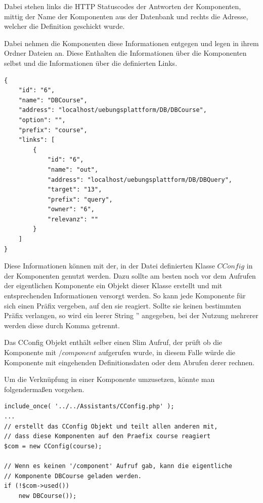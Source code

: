 Dabei stehen links die HTTP Statuscodes der Antworten der Komponenten, mittig der Name der Komponenten aus der Datenbank und rechts die Adresse, welcher die Definition geschickt wurde.

Dabei nehmen die Komponenten diese Informationen entgegen und legen in ihrem Ordner  Dateien an.
Diese Enthalten die Informationen über die Komponenten selbst und die Informationen über die definierten Links.

\begin{minipage}{\textwidth}
\begin{lstlisting}
{
    "id": "6",
    "name": "DBCourse",
    "address": "localhost/uebungsplattform/DB/DBCourse",
    "option": "",
    "prefix": "course",
    "links": [
        {
            "id": "6",
            "name": "out",
            "address": "localhost/uebungsplattform/DB/DBQuery",
            "target": "13",
            "prefix": "query",
            "owner": "6",
            "relevanz": ""
        }
    ]
}
\end{lstlisting}
\end{minipage}

Diese Informationen können mit der, in der Datei  definierten Klasse $CConfig$ in der Komponenten genutzt werden.
Dazu sollte am besten noch vor dem Aufrufen der eigentlichen Komponente ein Objekt dieser Klasse erstellt und mit entsprechenden Informationen versorgt werden. So kann jede Komponente für sich einen Präfix vergeben, auf den sie reagiert. Sollte sie keinen bestimmten Präfix verlangen, so wird ein leerer String '' angegeben, bei der Nutzung mehrerer werden diese durch Komma getrennt.

Das CConfig Objekt enthält selber einen Slim Aufruf, der prüft ob die Komponente mit $/component$ aufgerufen wurde, in diesem Falle würde die Komponente mit eingehenden Definitionsdaten oder dem Abrufen derer rechnen.

Um die Verknüpfung in einer Komponente umzusetzen, könnte man folgendermaßen vorgehen.

\begin{minipage}{\textwidth}
\begin{lstlisting}
include_once( '../../Assistants/CConfig.php' );
...
// erstellt das CConfig Objekt und teilt allen anderen mit,
// dass diese Komponenten auf den Praefix course reagiert
$com = new CConfig(course);

// Wenn es keinen '/component' Aufruf gab, kann die eigentliche
// Komponente DBCourse geladen werden.
if (!$com->used())
    new DBCourse());
  
\end{lstlisting}
\end{minipage}

